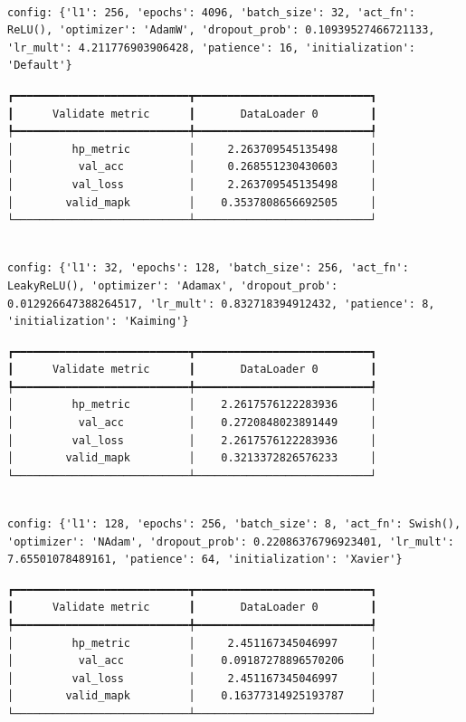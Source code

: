 \documentclass[
  letterpaper,
  DIV=11,
  numbers=noendperiod]{scrreprt}
\begin{document}
\begin{verbatim}

config: {'l1': 256, 'epochs': 4096, 'batch_size': 32, 'act_fn': ReLU(), 'optimizer': 'AdamW', 'dropout_prob': 0.10939527466721133, 'lr_mult': 4.211776903906428, 'patience': 16, 'initialization': 'Default'}
\end{verbatim}

\begin{verbatim}
┏━━━━━━━━━━━━━━━━━━━━━━━━━━━┳━━━━━━━━━━━━━━━━━━━━━━━━━━━┓
┃      Validate metric      ┃       DataLoader 0        ┃
┡━━━━━━━━━━━━━━━━━━━━━━━━━━━╇━━━━━━━━━━━━━━━━━━━━━━━━━━━┩
│         hp_metric         │     2.263709545135498     │
│          val_acc          │     0.268551230430603     │
│         val_loss          │     2.263709545135498     │
│        valid_mapk         │    0.3537808656692505     │
└───────────────────────────┴───────────────────────────┘
\end{verbatim}

\begin{verbatim}

config: {'l1': 32, 'epochs': 128, 'batch_size': 256, 'act_fn': LeakyReLU(), 'optimizer': 'Adamax', 'dropout_prob': 0.012926647388264517, 'lr_mult': 0.832718394912432, 'patience': 8, 'initialization': 'Kaiming'}
\end{verbatim}

\begin{verbatim}
┏━━━━━━━━━━━━━━━━━━━━━━━━━━━┳━━━━━━━━━━━━━━━━━━━━━━━━━━━┓
┃      Validate metric      ┃       DataLoader 0        ┃
┡━━━━━━━━━━━━━━━━━━━━━━━━━━━╇━━━━━━━━━━━━━━━━━━━━━━━━━━━┩
│         hp_metric         │    2.2617576122283936     │
│          val_acc          │    0.2720848023891449     │
│         val_loss          │    2.2617576122283936     │
│        valid_mapk         │    0.3213372826576233     │
└───────────────────────────┴───────────────────────────┘
\end{verbatim}

\begin{verbatim}

config: {'l1': 128, 'epochs': 256, 'batch_size': 8, 'act_fn': Swish(), 'optimizer': 'NAdam', 'dropout_prob': 0.22086376796923401, 'lr_mult': 7.65501078489161, 'patience': 64, 'initialization': 'Xavier'}
\end{verbatim}

\begin{verbatim}
┏━━━━━━━━━━━━━━━━━━━━━━━━━━━┳━━━━━━━━━━━━━━━━━━━━━━━━━━━┓
┃      Validate metric      ┃       DataLoader 0        ┃
┡━━━━━━━━━━━━━━━━━━━━━━━━━━━╇━━━━━━━━━━━━━━━━━━━━━━━━━━━┩
│         hp_metric         │     2.451167345046997     │
│          val_acc          │    0.09187278896570206    │
│         val_loss          │     2.451167345046997     │
│        valid_mapk         │    0.16377314925193787    │
└───────────────────────────┴───────────────────────────┘
\end{verbatim}
\end{document}
